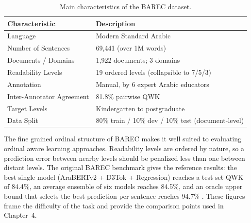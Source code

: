 \begin{table}[H]

\centering

\caption{Main characteristics of the BAREC dataset.}

\label{tab:barec_characteristics}

\begin{tabular}{p{5cm} p{6cm}}

\toprule

\textbf{Characteristic} & \textbf{Description} \\

\midrule

Language & Modern Standard Arabic \\

Number of Sentences & 69,441 (over 1M words) \\

Documents / Domains & 1,922 documents; 3 domains \\

Readability Levels & 19 ordered levels (collapsible to 7/5/3) \\

Annotation & Manual, by 6 expert Arabic educators \\

Inter-Annotator Agreement & 81.8\% pairwise QWK \\

Target Levels & Kindergarten to postgraduate \\

Data Split & 80\% train / 10\% dev / 10\% test (document-level) \\

\bottomrule

\end{tabular}

\end{table}

The fine grained ordinal structure of BAREC makes it well suited to evaluating ordinal aware learning approaches. Readability levels are ordered by nature, so a prediction error between nearby levels should be penalized less than one between distant levels. The original BAREC benchmark gives the reference results: the best single model (AraBERTv2 + D3Tok + Regression) reaches a test set QWK  of 84.4\%, an average ensemble of six models reaches 84.5\%, and an oracle upper bound that selects the best prediction per sentence reaches 94.7\% \cite{elmadani2025barec}. These figures frame the difficulty of the task and provide the comparison points used in Chapter~4.
